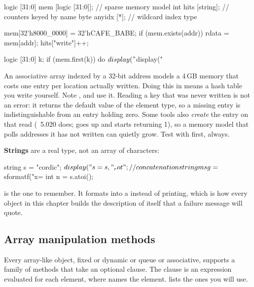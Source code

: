 \begin{svcode}
logic [31:0] mem [logic [31:0]];   // sparse memory model
int          hits [string];        // counters keyed by name
byte         anyidx [*];           // wildcard index type

mem[32'h8000_0000] = 32'hCAFE_BABE;
if (mem.exists(addr)) rdata = mem[addr];
hits["write"]++;

logic [31:0] k;
if (mem.first(k)) do $display("%
$display("%
\end{svcode}

An associative array indexed by a 32-bit address models a 4\,GB memory that
costs one entry per location actually written. Doing this in \VHDL{} means a
hash table you write yourself. Note , and use it. Reading a key
that was never written is not an error: it returns the default value of the
element type, so a missing entry is indistinguishable from an entry holding
zero. Some tools also \emph{create} the entry on that read
(~5.020 does;  goes up and 
starts returning 1), so a memory model that polls addresses it has not written
can quietly grow. Test with  first, always.

\textbf{Strings} are a real type, not an array of characters:

\begin{svcode}
string s = "cordic";
$display("%
s = {s, "_rot"};                       // concatenation
string msg = $sformatf("x=%
int    n   = s.atoi();
\end{svcode}

 is the one to remember. It formats into a 
instead of printing, which is how every object in this chapter builds the
description of itself that a failure message will quote.

\subsection{Array manipulation methods}

Every array-like object, fixed or dynamic or queue or associative, supports a
family of methods that take an optional  clause. The 
clause is an expression evaluated for each element, where  names
the element.  lists the ones you will use.

